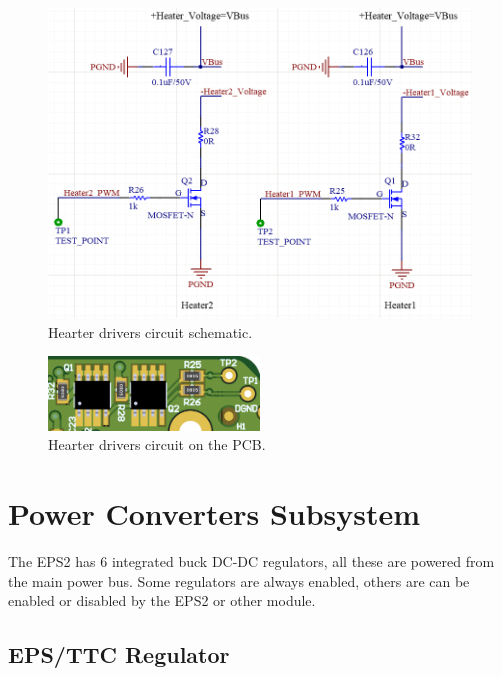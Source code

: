 \begin{figure}[!ht]
    \begin{center}
        \includegraphics[width=\textwidth]{figures/heaters-drivers-circuit-schematic.png}
        \caption{Hearter drivers circuit schematic.}
        \label{fig:heaters-circuit-schematic}
    \end{center}
\end{figure}

\begin{figure}[!ht]
    \begin{center}
        \includegraphics[width=0.5\textwidth]{figures/heaters-drivers-circuit-3d.png}
        \caption{Hearter drivers circuit on the PCB.}
        \label{fig:heaters-drivers-circuit-3d}
    \end{center}
\end{figure}

\section{Power Converters Subsystem}

The EPS2 has 6 integrated buck DC-DC regulators, all these are powered from the main power bus. Some regulators are always enabled, others are can be enabled or disabled by the EPS2 or other module.

\subsection{EPS/TTC Regulator}


